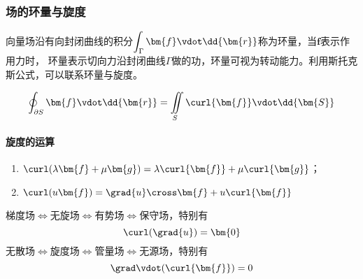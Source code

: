 \subsubsection{场的环量与旋度}
向量场沿有向封闭曲线的积分$\displaystyle\int_\Gamma \bm{f}\vdot\dd{\bm{r}}$称为环量，当$\bm{f}$表示作用力时，
环量表示切向力沿封闭曲线$\Gamma$做的功，环量可视为转动能力。利用斯托克斯公式，可以联系环量与旋度。

\[ \oint_{\partial S}\bm{f}\vdot\dd{\bm{r}} = \iint\limits_S \curl{\bm{f}}\vdot\dd{\bm{S}} \]

\paragraph{旋度的运算}
\begin{enumerate}[(1)]
    \item $\curl(\lambda\bm{f}+\mu\bm{g})=\lambda\curl{\bm{f}} + \mu\curl{\bm{g}}$；
    \item $\curl(u\bm{f})=\grad{u}\cross\bm{f} + u\curl{\bm{f}}$
\end{enumerate}

梯度场$\iff$无旋场$\iff$有势场$\iff$保守场，特别有
\[ \curl(\grad{u}) = \bm{0} \]
无散场$\iff$旋度场$\iff$管量场$\iff$无源场，特别有
\[ \grad\vdot(\curl{\bm{f}}) = 0 \]